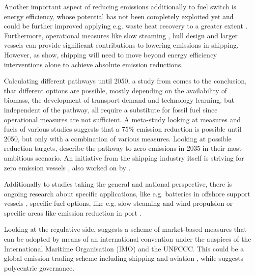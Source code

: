 \documentclass[article]{elsarticle}
\begin{document}
Another important aspect of reducing emissions additionally to fuel switch is energy efficiency, whose potential has not been completely exploited yet \cite{JAFARZADEH2014,CHI2018} and could be further improved applying e.g. waste heat recovery to a greater extent \cite{Baldi2015}. Furthermore, operational measures like slow steaming \cite{ARMSTRONG2013}, hull design and larger vessels \cite{LINDSTAD2015} can provide significant contributions to lowering emissions in shipping. However, as \citet{Olmer2017} show, shipping will need to move beyond energy efficiency interventions alone to achieve absolute emission reductions.

Calculating different pathways until 2050, a study from \citet{LloydsRegister2016} comes to the conclusion, that different options are possible, mostly depending on the availability of biomass, the development of transport demand and technology learning, but independent of the pathway, all require a substitute for fossil fuel since operational measures are not sufficient. A meta-study looking at measures and fuels of various studies \cite{Bouman2017} suggests that a 75\% emission reduction is possible until 2050, but only with a combination of various measures. Looking at possible reduction targets, \citet{Smith2016} describe the pathway to zero emissions in 2035 in their most ambitious scenario. An initiative from the shipping industry itself is striving for zero emission vessels \cite{SSI2018}, also worked on by \citet{LloydsRegister2017}. 

Additionally to studies taking the general and national perspective, there is ongoing research about specific applications, like e.g. batteries in offshore support vessels \cite{Lindstad2017}, specific fuel options, like e.g. slow steaming and wind propulsion \cite{MANDER2017} or specific areas like emission reduction in port \cite{WINNES2015}.

Looking at the regulative side, \citet{SHI2016} suggests a scheme of market-based measures that can be adopted by means of an international convention under the auspices of the International Maritime Organisation (IMO) and the UNFCCC. This could be a global emission trading scheme including shipping and aviation \cite{Dessens2014}, while \citet{GRITSENKO2017} suggests polycentric governance.
\end{document}
